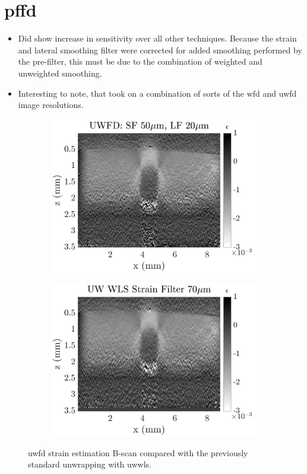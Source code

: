 \section{\ac{pffd}}
\begin{itemize}
	\item Did show increase in sensitivity over all other techniques. Because the strain and lateral smoothing filter were corrected for added smoothing performed by the pre-filter, this must be due to the combination of weighted and unweighted smoothing.
 	\item Interesting to note, that took on a combination of sorts of the \ac{wfd} and \ac{uwfd} image resolutions. 
\end{itemize}

\begin{figure}
	\centering
	\begin{subfigure}{0.49\textwidth}
		\centering
		\includegraphics[width=\textwidth]{figures/uwfd_compare.png}
	\end{subfigure}
	\begin{subfigure}{0.49\textwidth}
		\centering
		\includegraphics[width=\textwidth]{figures/wls_compare.png}
	\end{subfigure}
	\caption{\ac{uwfd} strain estimation B-scan compared with the previously standard unwrapping with \ac{uwwls}.}
	\label{wls_uwfd_compare}
\end{figure}

